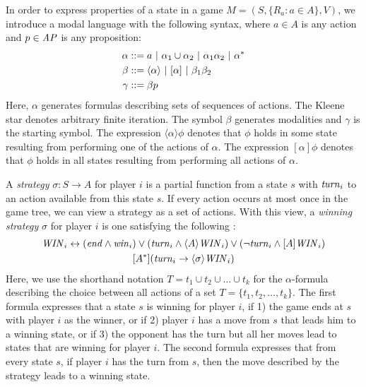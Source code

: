 In order to express properties of a state in a game $ M = (S, \{ R_{a} : a \in A \}, V) $, we introduce a modal language with the following syntax, where $ a \in A $ is any action and $ p \in \mathit{AP} $ is any proposition:
\begin{align*}
\alpha &::= a \ | \  \alpha_{1} \cup \alpha_{2} \ | \  \alpha_{1} \alpha_{2} \ | \  \alpha^{\ast} \\
\beta &::= \langle \alpha \rangle \ | \  [\alpha] \ | \  \beta_{1} \beta_{2} \\
\gamma &::= \beta p
\end{align*}
Here, $ \alpha $ generates formulas describing sets of sequences of actions. The Kleene star denotes arbitrary finite iteration. The symbol $ \beta $ generates modalities and $ \gamma $ is the starting symbol. The expression $ \langle \alpha \rangle \phi $ denotes that $ \phi $ holds in some state resulting from performing one of the actions of $ \alpha $. The expression $ [\alpha] \phi $ denotes that $ \phi $ holds in all states resulting from performing all actions of $ \alpha $.

A \emph{strategy} $ \sigma : S \rightarrow A $ for player $ i $ is a partial function from a state $ s $ with $ \mathit{turn}_{i} $ to an action available from this state $ s $. If every action occurs at most once in the game tree, we can view a strategy as a set of actions. With this view, a \emph{winning strategy} $ \sigma $ for player $ i $ is one satisfying the following \cite{benthem2001a}:
\begin{gather*}
\mathit{WIN}_{i} \leftrightarrow (\mathit{end} \wedge \mathit{win}_{i}) \vee (\mathit{turn}_{i} \wedge \langle A \rangle \mathit{WIN}_{i}) \vee (\neg \mathit{turn}_{i} \wedge [A] \mathit{WIN}_{i}) \\
[A^{\ast}](\mathit{turn}_{i} \rightarrow \langle \sigma \rangle \mathit{WIN}_{i})
\end{gather*}
Here, we use the shorthand notation $ T = t_{1} \cup t_{2} \cup \dots \cup t_{k} $ for the $ \alpha $-formula describing the choice between all actions of a set $ T = \{ t_{1}, t_{2}, \dots, t_{k} \} $. The first formula expresses that a state $ s $ is winning for player $ i $, if 1) the game ends at $ s $ with player $ i $ as the winner, or if 2) player $ i $ has a move from $ s $ that leads him to a winning state, or if 3) the opponent has the turn but all her moves lead to states that are winning for player $ i $. The second formula expresses that from every state $ s $, if player $ i $ has the turn from $ s $, then the move described by the strategy leads to a winning state.

